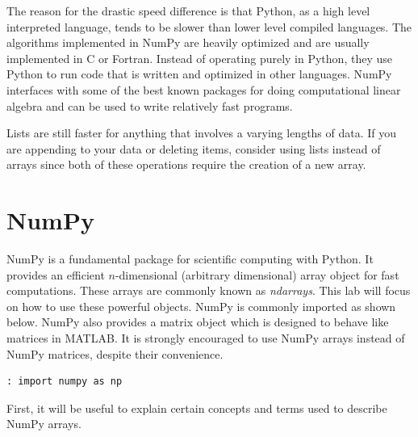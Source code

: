 % 

The reason for the drastic speed difference is that Python, as a high level interpreted language, tends to be slower than lower level compiled languages.
The algorithms implemented in NumPy are heavily optimized and are usually implemented in C or Fortran.
Instead of operating purely in Python, they use Python to run code that is written and optimized in other languages.
NumPy interfaces with some of the best known packages for doing computational linear algebra and can be used to write relatively fast programs.

Lists are still faster for anything that involves a varying lengths of data.
If you are appending to your data or deleting items, consider using lists instead of arrays since both of these operations require the creation of a new array.

\section*{NumPy}
NumPy is a fundamental package for scientific computing with Python.
It provides an efficient $n$-dimensional (arbitrary dimensional) array object for fast computations.
These arrays are commonly known as \emph{ndarrays}.
This lab will focus on how to use these powerful objects.
NumPy is commonly imported as shown below.
NumPy also provides a matrix object which is designed to behave like matrices in MATLAB.
It is strongly encouraged to use NumPy arrays instead of NumPy matrices, despite their convenience.
\begin{lstlisting}
: import numpy as np
\end{lstlisting}
First, it will be useful to explain certain concepts and terms used to describe NumPy arrays.

